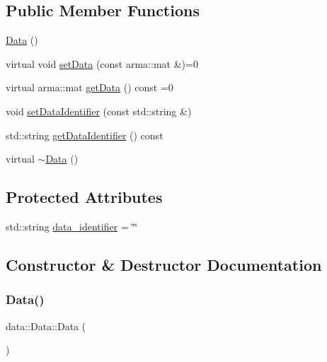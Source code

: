 \subsection*{Public Member Functions}
\begin{DoxyCompactItemize}
\item 
\mbox{\hyperlink{classdata_1_1_data_ae571957bf5380fe4b3233dd799063f1e}{Data}} ()
\item 
virtual void \mbox{\hyperlink{classdata_1_1_data_a0e928c49b31f803e7984cc24e2f73f70}{set\+Data}} (const arma\+::mat \&)=0
\item 
virtual arma\+::mat \mbox{\hyperlink{classdata_1_1_data_aa4073af1bc8ccc7c50809e1676436eb4}{get\+Data}} () const =0
\item 
void \mbox{\hyperlink{classdata_1_1_data_a62bcea680e1a7d1d4ecec60c111936dc}{set\+Data\+Identifier}} (const std\+::string \&)
\item 
std\+::string \mbox{\hyperlink{classdata_1_1_data_a1af63a4e5aa708de31e1ffdd727a4e16}{get\+Data\+Identifier}} () const
\item 
virtual \mbox{\hyperlink{classdata_1_1_data_a737d2c889ffb7c08d60b5af5846b586b}{$\sim$\+Data}} ()
\end{DoxyCompactItemize}
\subsection*{Protected Attributes}
\begin{DoxyCompactItemize}
\item 
std\+::string \mbox{\hyperlink{classdata_1_1_data_ad61ef163c5ec01dd46be054a688d2be8}{data\+\_\+identifier}} = \char`\"{}\char`\"{}
\end{DoxyCompactItemize}


\subsection{Constructor \& Destructor Documentation}
\mbox{\label{classdata_1_1_data_ae571957bf5380fe4b3233dd799063f1e}} 
\subsubsection{\texorpdfstring{Data()}{Data()}}
{\footnotesize\ttfamily data\+::\+Data\+::\+Data (\begin{DoxyParamCaption}{ }\end{DoxyParamCaption})}

